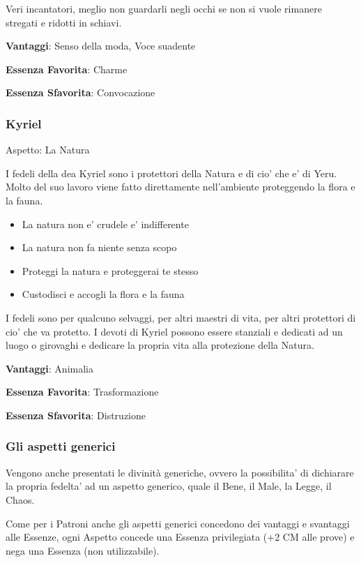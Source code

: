 \documentclass[a4paper,11pt,twoside,openany]{book}
\begin{document}
Veri incantatori, meglio non guardarli negli occhi se non si vuole rimanere stregati e ridotti in schiavi.


\textbf{Vantaggi}: Senso della moda, Voce suadente

\textbf{Essenza Favorita}: Charme

\textbf{Essenza Sfavorita}: Convocazione

\bigskip

\subsubsection{Kyriel} 

Aspetto: La Natura
\bigskip

I fedeli della dea Kyriel sono i protettori della Natura e di cio' che e' di Yeru. Molto del suo lavoro viene fatto direttamente nell'ambiente proteggendo la flora e la fauna.

\begin{itemize}
	\item La natura non e' crudele e' indifferente
	\item La natura non fa niente senza scopo
	\item Proteggi la natura e proteggerai te stesso
	\item Custodisci e accogli la flora e la fauna
\end{itemize}

I fedeli sono per qualcuno selvaggi, per altri maestri di vita, per altri protettori di cio' che va protetto. I devoti di Kyriel possono essere stanziali e dedicati ad un luogo o girovaghi e dedicare la propria vita alla protezione della Natura.


\textbf{Vantaggi}: Animalia

\textbf{Essenza Favorita}: Trasformazione

\textbf{Essenza Sfavorita}: Distruzione
\bigskip

\subsubsection{Gli aspetti generici}

\medskip

Vengono anche presentati le divinità generiche, ovvero la possibilita' di dichiarare la propria fedelta' ad un aspetto generico, quale il Bene, il Male, la Legge, il Chaos.

Come per i Patroni anche gli aspetti generici concedono dei vantaggi e svantaggi alle Essenze, ogni Aspetto concede una Essenza privilegiata (+2 CM alle prove) e nega una Essenza (non utilizzabile).
\end{document}
